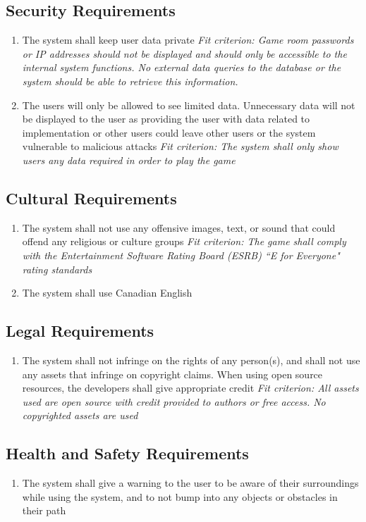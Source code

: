 \documentclass[12pt]{article}
\begin{document}
\subsection{Security Requirements}
\begin{enumerate}[SR\arabic*.]
    \item The system shall keep user data private\newline
    \textit{Fit criterion: Game room passwords or IP addresses should not be displayed and should only be accessible to the internal system functions. No external data queries to the database or the system should be able to retrieve this information.}
    \item The users will only be allowed to see limited data. Unnecessary data will not be displayed to the user as providing the user with data related to implementation or other users could leave other users or the system vulnerable to malicious attacks\newline
    \textit{Fit criterion: The system shall only show users any data required in order to play the game}
\end{enumerate}
\subsection{Cultural Requirements}
\begin{enumerate}[CR\arabic*]
    \item The system shall not use any offensive images, text, or sound that could offend any religious or culture groups
    \textit{Fit criterion: The game shall comply with the Entertainment Software Rating Board (ESRB) ``E for Everyone" rating standards~\citep{ESRB}}
    \item The system shall use Canadian English
\end{enumerate}
\subsection{Legal Requirements}
\begin{enumerate}[LR\arabic*]
    \item The system shall not infringe on the rights of any person(s), and shall not use any assets that infringe on copyright claims. When using open source resources, the developers shall give appropriate credit
    \textit{Fit criterion: All assets used are open source with credit provided to authors or free access. No copyrighted assets are used}
\end{enumerate}
\subsection{Health and Safety Requirements}
\begin{enumerate}[HS\arabic*]
    \item The system shall give a warning to the user to be aware of their surroundings while using the system, and to not bump into any objects or obstacles in their path
\end{enumerate}
\end{document}
